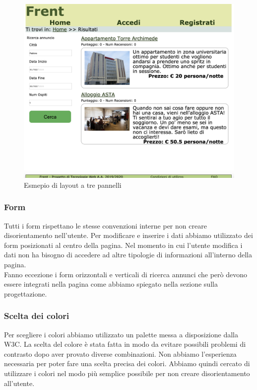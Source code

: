 \documentclass[1_relazione.tex]{subfiles}
\begin{document}
\begin{figure}[h!]
    \centering
    \includegraphics[scale=0.3]{immagini/LayoutTrePannelli.png}
    \caption{Esmepio di layout a tre pannelli}
\end{figure}

\subsubsection{Form}
Tutti i form rispettano le stesse convenzioni interne per non creare disorientamento nell'utente. Per modificare e inserire i dati abbiamo utilizzato dei form posizionati al centro della pagina. Nel momento in cui l'utente modifica i dati non ha bisogno di accedere ad altre tipologie di informazioni all'interno della pagina.\\ Fanno eccezione i form orizzontali e verticali di ricerca annunci che per\`{o} devono essere integrati nella pagina come abbiamo spiegato nella sezione sulla progettazione.

\subsubsection{Scelta dei colori}
Per scegliere i colori abbiamo utilizzato un palette messa a disposizione dalla W3C. La scelta del colore \`{e} stata fatta in modo da evitare possibili problemi di contrasto dopo aver provato diverse combinazioni. Non abbiamo l'esperienza necessaria per poter fare una scelta precisa dei colori. Abbiamo quindi cercato di utilizzare i colori nel modo pi\`{u} semplice possibile per non creare disorientamento all'utente.
\end{document}
